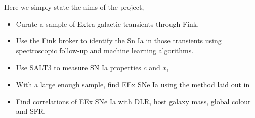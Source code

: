 Here we simply state the aims of the project, 
\begin{itemize}
    \item Curate a sample of Extra-galactic transients through Fink.
    \item Use the Fink broker to identify the Sn Ia in those transients using spectroscopic follow-up and machine learning algorithms.
    \item Use SALT3 to measure SN Ia properties \(c\) and \(x_1\)
    \item With a large enough sample, find EEx SNe Ia using the method laid out in \textcite{deckers_constraining_2022}
    \item Find correlations of EEx SNe Ia with DLR, host galaxy mass, global colour and SFR.
\end{itemize}